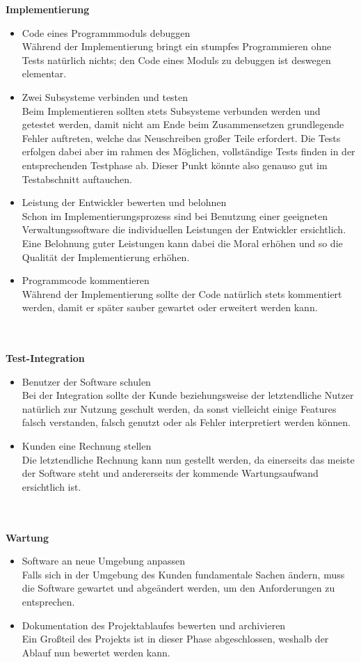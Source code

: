 \documentclass[a4paper,graphics,11pt]{article}
\begin{document}
\textbf{Implementierung}
\begin{itemize}
\item Code eines Programmmoduls debuggen\\
Während der Implementierung bringt ein stumpfes Programmieren ohne Tests natürlich nichts; den Code eines Moduls zu debuggen ist deswegen elementar.
\item Zwei Subsysteme verbinden und testen\\
Beim Implementieren sollten stets Subsysteme verbunden werden und getestet werden, damit nicht am Ende beim Zusammensetzen grundlegende Fehler auftreten, welche 
das Neuschreiben großer Teile erfordert. Die Tests erfolgen dabei aber im rahmen des Möglichen, vollständige Tests finden in der entsprechenden Testphase ab. Dieser Punkt
könnte also genauso gut im Testabschnitt auftauchen.
\item Leistung der Entwickler bewerten und belohnen\\
Schon im Implementierungsprozess sind bei Benutzung einer geeigneten Verwaltungssoftware die individuellen Leistungen der Entwickler ersichtlich. Eine Belohnung guter
Leistungen kann dabei die Moral erhöhen und so die Qualität der Implementierung erhöhen.
\item Programmcode kommentieren \\
Während der Implementierung sollte der Code natürlich stets kommentiert werden, damit er später sauber gewartet oder erweitert werden kann.
\end{itemize} \ \\ \ \\
\textbf{Test-Integration}
\begin{itemize}
\item Benutzer der Software schulen\\
Bei der Integration sollte der Kunde beziehungsweise der letztendliche Nutzer natürlich zur Nutzung geschult werden, da sonst vielleicht einige Features falsch
verstanden, falsch genutzt oder als Fehler interpretiert werden können.
\item Kunden eine Rechnung stellen \\
Die letztendliche Rechnung kann nun gestellt werden, da einerseits das meiste der Software steht und andererseits der kommende Wartungsaufwand ersichtlich ist.
\end{itemize} \ \\ \ \\
\textbf{Wartung}
\begin{itemize}
\item Software an neue Umgebung anpassen\\
Falls sich in der Umgebung des Kunden fundamentale Sachen ändern, muss die Software gewartet und abgeändert werden, um den Anforderungen zu entsprechen.
\item Dokumentation des Projektablaufes bewerten und archivieren\\
Ein Großteil des Projekts ist in dieser Phase abgeschlossen, weshalb der Ablauf nun bewertet werden kann.
\end{itemize} \ \\ \ \\
\end{document}
